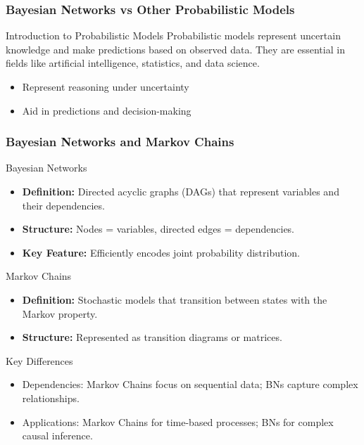 \documentclass[aspectratio=169]{beamer}
\begin{document}
\begin{frame}[fragile]
    \frametitle{Bayesian Networks vs Other Probabilistic Models}
    
    \begin{block}{Introduction to Probabilistic Models}
        Probabilistic models represent uncertain knowledge and make predictions based on observed data. They are essential in fields like artificial intelligence, statistics, and data science.
    \end{block}

    \begin{itemize}
        \item Represent reasoning under uncertainty
        \item Aid in predictions and decision-making
    \end{itemize}
\end{frame}

\begin{frame}[fragile]
    \frametitle{Bayesian Networks and Markov Chains}

    \begin{block}{Bayesian Networks}
        \begin{itemize}
            \item \textbf{Definition:} Directed acyclic graphs (DAGs) that represent variables and their dependencies.
            \item \textbf{Structure:} Nodes = variables, directed edges = dependencies.
            \item \textbf{Key Feature:} Efficiently encodes joint probability distribution.
        \end{itemize}
    \end{block}

    \begin{block}{Markov Chains}
        \begin{itemize}
            \item \textbf{Definition:} Stochastic models that transition between states with the Markov property.
            \item \textbf{Structure:} Represented as transition diagrams or matrices.
        \end{itemize}
    \end{block}

    \begin{block}{Key Differences}
        \begin{itemize}
            \item Dependencies: Markov Chains focus on sequential data; BNs capture complex relationships.
            \item Applications: Markov Chains for time-based processes; BNs for complex causal inference.
        \end{itemize}
    \end{block}
\end{frame}
\end{document}
